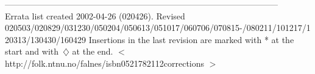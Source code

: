 \documentclass[a4paper,12pt]{article}
\begin{document}
\noindent
------------------------------------------------------------------------------------------------ \\
Errata list created 2002-04-26 (020426). %
\newline \noindent 
Revised 020503/020829/031230/050204/050613/051017/060706/070815-\newline/080211/101217/120313/130430/160429%
\newline
Insertions in the last revision are marked with * at the start and with \,{$\diamondsuit$} at the end.
\newline
$<$ http://folk.ntnu.no/falnes/isbn0521782112corrections $>$



\pagebreak


%
\end{document}
